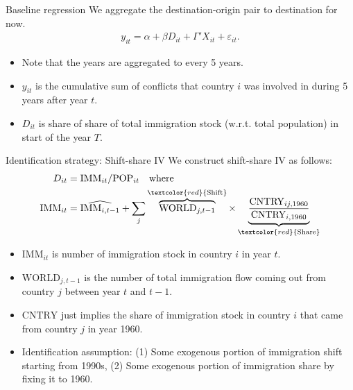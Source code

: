 \documentclass[notes,11pt, aspectratio=169]{beamer}
\begin{document}
\begin{frame}{Baseline regression}
	We aggregate the destination-origin pair to destination for now.
\begin{align*}
	y_{it} = \alpha + \beta D_{it} + \Gamma' X_{it} + \varepsilon_{it}. 
\end{align*}	

\begin{itemize}
	\item Note that the years are aggregated to every 5 years.
	\item $y_{it}$ is the cumulative sum of conflicts that country $i$ was involved in during 5 years after year $t$.
	\item $D_{it}$ is share of share of total immigration stock (w.r.t. total population) in start of the year $T$. 
\end{itemize}
\end{frame}


\begin{frame}{Identification strategy: Shift-share IV}
	We construct shift-share IV as follows:
	\begin{align*}
		D_{it} &= \text{IMM}_{it} / \text{POP}_{it} \quad \text{where}\\ \nonumber  
		\text{IMM}_{it}  &= \widehat{\text{IMM}_{i,t-1}} +  \sum_j \overbrace{\text{WORLD}_{j,t-1}}^{\textcolor{red}{\text{Shift}}} \times \underbrace{\frac{\text{CNTRY}_{ij, 1960}}{\text{CNTRY}_{i,1960}}}_{\textcolor{red}{\text{Share}}}	
	\end{align*}

	\begin{itemize}
		\item $\text{IMM}_{it}$ is number of immigration stock in country $i$ in year $t$.
		\item $\text{WORLD}_{j,t-1}$ is the number of total immigration flow  coming out from country $j$ between year $t$ and $t-1$.
		\item $\text{CNTRY}$ just implies the share of immigration stock in country $i$ that came from country $j$ in year 1960.
		\item Identification assumption: (1) Some exogenous portion of immigration shift starting from 1990s, (2) Some exogenous portion of immigration share by fixing it to 1960.
	\end{itemize}
\end{frame}
\end{document}
